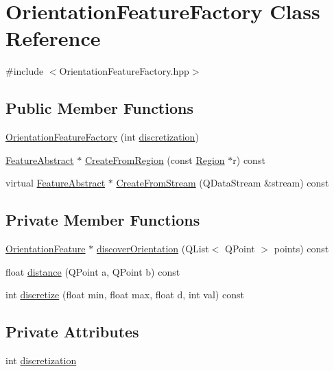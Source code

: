 \hypertarget{class_orientation_feature_factory}{\section{Orientation\+Feature\+Factory Class Reference}
\label{class_orientation_feature_factory}
}


{\ttfamily \#include $<$Orientation\+Feature\+Factory.\+hpp$>$}

\subsection*{Public Member Functions}
\begin{DoxyCompactItemize}
\item 
\hyperlink{class_orientation_feature_factory_ad78c564940442d3c76db9ef03d6c8a03}{Orientation\+Feature\+Factory} (int \hyperlink{class_orientation_feature_factory_abcd8932fe77877dff6657e4070882015}{discretization})
\item 
\hyperlink{class_feature_abstract}{Feature\+Abstract} $\ast$ \hyperlink{class_orientation_feature_factory_ace31b961efc6bdfa405effffd7d63c96}{Create\+From\+Region} (const \hyperlink{class_region}{Region} $\ast$r) const 
\item 
virtual \hyperlink{class_feature_abstract}{Feature\+Abstract} $\ast$ \hyperlink{class_orientation_feature_factory_a5b208e0c81ee1a3062c0b00e48967914}{Create\+From\+Stream} (Q\+Data\+Stream \&stream) const 
\end{DoxyCompactItemize}
\subsection*{Private Member Functions}
\begin{DoxyCompactItemize}
\item 
\hyperlink{class_orientation_feature}{Orientation\+Feature} $\ast$ \hyperlink{class_orientation_feature_factory_a3ba5ebad39d7b2b6d1065208ee2fb60e}{discover\+Orientation} (Q\+List$<$ Q\+Point $>$ points) const 
\item 
float \hyperlink{class_orientation_feature_factory_a68e87a390c95060cac05065757daa18d}{distance} (Q\+Point a, Q\+Point b) const 
\item 
int \hyperlink{class_orientation_feature_factory_a280c15eebea7646e9b602c36979b8b16}{discretize} (float min, float max, float d, int val) const 
\end{DoxyCompactItemize}
\subsection*{Private Attributes}
\begin{DoxyCompactItemize}
\item 
int \hyperlink{class_orientation_feature_factory_abcd8932fe77877dff6657e4070882015}{discretization}
\end{DoxyCompactItemize}


